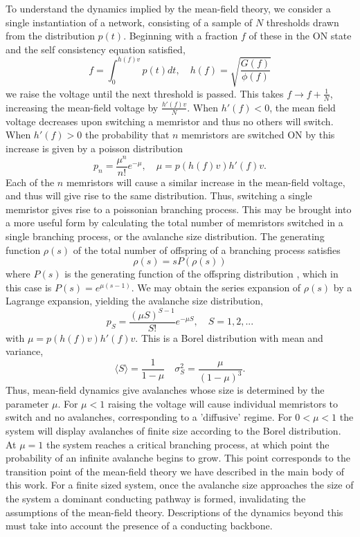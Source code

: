 \documentclass[aps,prl,reprint,groupedaddress]{revtex4-1}
\begin{document}
To understand the dynamics implied by the mean-field theory, we consider a single instantiation of
a network, consisting of a sample of $N$ thresholds drawn from the distribution $p(t)$. Beginning
with a fraction $f$ of these in the ON state and the self consistency equation satisfied,
\[ f = \int_0^{h(f) v} p(t) dt,\quad h(f) = \sqrt{\frac{G(f)}{\phi(f)}}\]
we raise the voltage until the next threshold is passed.  This takes $f\to f+\frac{1}{N}$, increasing 
the mean-field voltage by $\frac{h'(f)v}{N}$.  When $h'(f) < 0$, the mean field voltage decreases upon
 switching a memristor and thus no others will switch. When $h'(f) > 0$ the probability that $n$ memristors are switched ON
 by this increase is given by a poisson distribution
\[p_n = \frac{\mu^n}{n!} e^{-\mu}, \quad \mu = p(h(f)v) h'(f)v.\]
Each of the $n$ memristors will cause a similar increase in the mean-field voltage, and thus will give rise to the same distribution.  Thus, switching a single memristor gives rise to a poissonian
branching process.  This may be brought into a more useful form by calculating the total number of
memristors switched in a single branching process, or the avalanche size distribution.  The
generating function $\rho(s)$ of the total number of offspring of a branching process satisfies
\[\rho(s) = sP(\rho(s))\]
where $P(s)$ is the generating function of the offspring distribution \cite{Feller1968}, which in this case is $P(s) = e^{\mu(s-1)}$. We may obtain the series expansion of $\rho(s)$ by a Lagrange expansion,
yielding the avalanche size distribution,
\[p_S = \frac{(\mu S)^{S-1}}{S!} e^{-\mu S}, \quad S=1, 2, ...\]
with $\mu= p(h(f)v) h'(f)v$. This is a Borel distribution with mean and
variance,
\[\langle S \rangle = \frac{1}{1-\mu}\quad \sigma_S^2 = \frac{\mu}{(1-\mu)^3}.\]
Thus, mean-field dynamics give avalanches whose size is determined by the
parameter $\mu$.  For $\mu < 1$ raising the voltage will cause individual memristors to switch and no avalanches, corresponding to a 'diffusive' regime. For $0<\mu < 1$ the system will display avalanches of finite size according to the Borel distribution.  At $\mu=1$
the system reaches a critical branching process, at which point the probability of an infinite avalanche begins to grow.  This point corresponds to the transition point of the mean-field theory we have described in the main body of this work. For a finite sized system, once the avalanche size approaches the size of the system a dominant conducting pathway is formed, invalidating the assumptions of the mean-field theory.  Descriptions of the dynamics beyond this must take into account the presence of a conducting backbone.
\end{document}
